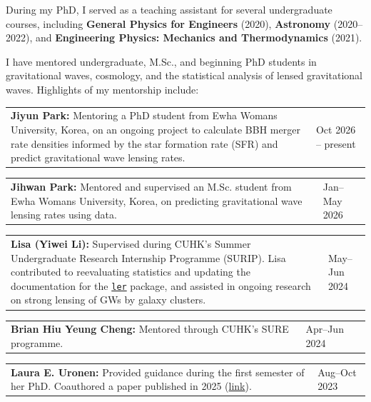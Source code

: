 \documentclass[margin,line]{res}
\begin{document}
\begin{resume}
During my PhD, I served as a teaching assistant for several undergraduate courses, including \textbf{General Physics for Engineers} (2020), \textbf{Astronomy} (2020--2022), and \textbf{Engineering Physics: Mechanics and Thermodynamics} (2021).

I have mentored undergraduate, M.Sc., and beginning PhD students in gravitational waves, cosmology, and the statistical analysis of lensed gravitational waves. Highlights of my mentorship include:

\begin{tabular}{@{}p{\dimexpr\linewidth-0.62in-3\tabcolsep\relax}p{0.62in}}
\textbf{Jiyun Park:} Mentoring a PhD student from Ewha Womans University, Korea, on an ongoing project to calculate BBH merger rate densities informed by the star formation rate (SFR) and predict gravitational wave lensing rates. & \raggedright Oct 2026 -- present
\end{tabular}

\begin{tabular}{@{}p{\dimexpr\linewidth-0.62in-3\tabcolsep\relax}p{0.62in}}
\textbf{Jihwan Park:} Mentored and supervised an M.Sc. student from Ewha Womans University, Korea, on predicting gravitational wave lensing rates using data. & \raggedright Jan--May 2026
\end{tabular}

\begin{tabular}{@{}p{\dimexpr\linewidth-0.62in-3\tabcolsep\relax}p{0.62in}}
\textbf{Lisa (Yiwei Li):} Supervised during CUHK's Summer Undergraduate Research Internship Programme (SURIP). Lisa contributed to reevaluating statistics and updating the documentation for the \href{https://ler.readthedocs.io/en/latest/}{\texttt{ler}} package, and assisted in ongoing research on strong lensing of GWs by galaxy clusters. & \raggedright May--Jun 2024
\end{tabular}

\begin{tabular}{@{}p{\dimexpr\linewidth-0.62in-3\tabcolsep\relax}p{0.62in}}
\textbf{Brian Hiu Yeung Cheng:} Mentored through CUHK's SURE programme. & \raggedright Apr--Jun 2024
\end{tabular}

\begin{tabular}{@{}p{\dimexpr\linewidth-0.62in-3\tabcolsep\relax}p{0.62in}}
\textbf{Laura E. Uronen:} Provided guidance during the first semester of her PhD. Coauthored a paper published in 2025 (\href{https://arxiv.org/abs/2406.14257}{link}). & \raggedright Aug--Oct 2023
\end{tabular}


\end{resume}
\end{document}
